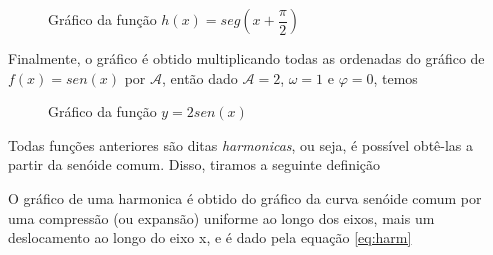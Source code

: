 \begin{figure}[H]
    \caption{Gráfico da função $h(x) = seg\left(x + \dfrac{\pi}{2}\right)$}
    \label{fig:deslocSen}
\end{figure}

Finalmente, o gráfico \senoide é obtido multiplicando todas as ordenadas do gráfico de 
$f(x) = sen(x)$ por $\mathcal{A}$, então dado $\mathcal{A} = 2$, $\omega = 1$ e 
$\varphi = 0$, temos

\begin{figure}[H]
    \caption{Gráfico da função $y = 2sen(x)$}
    \label{fig:ampSen}
\end{figure}

Todas funções anteriores são ditas \textit{harmonicas}, ou seja, é possível obtê-las
a partir da senóide comum. Disso, tiramos a seguinte definição\\

\begin{definicao}
\label{def:harmonico}
    O gráfico de uma harmonica é obtido do gráfico da curva senóide 
    comum por uma compressão (ou expansão) uniforme ao longo dos eixos,
    mais um deslocamento ao longo do eixo x, e é dado pela equação \ref{eq:harm}
\end{definicao}


